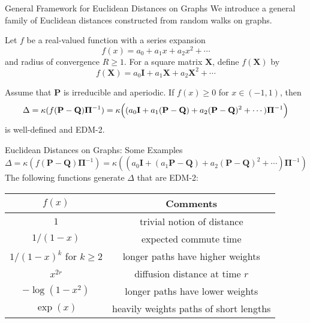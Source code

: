 \documentclass[professionalfonts, hyperref={pdfpagelabels=false,
  colorlinks=true, linkcolor=purple}]{beamer}
\begin{document}
\begin{frame}{General Framework for Euclidean Distances on Graphs}
  We introduce a general family of Euclidean distances constructed
  from random walks on graphs. 
  
  \vskip10pt Let $f$ be a real-valued function with a
    series expansion
    \begin{equation*}
      f(x) = a_0 + a_1 x + a_2 x^2 + \cdots
    \end{equation*}
    and radius of convergence $R \geq 1$. For a square matrix
    $\mathbf{X}$, define $f(\mathbf{X})$ by
    \begin{equation*}
      f(\mathbf{X}) = a_0 \mathbf{I} + a_1 \mathbf{X} + a_2
      \mathbf{X}^{2} + \cdots
    \end{equation*}
    \begin{theorem}
      Assume that $\mathbf{P}$ is irreducible and aperiodic. If $f(x)
      \geq 0$ for $x \in (-1,1)$, then
      \begin{equation}
        \Delta = \kappa(f(\mathbf{P} - \mathbf{Q})
        \bm{\Pi}^{-1}) =
        \kappa\Bigl((a_0
        \mathbf{I} + a_1 (\mathbf{P} - \mathbf{Q}) + a_2 (\mathbf{P} -
        \mathbf{Q})^2 + \cdots)\bm{\Pi}^{-1}\Bigr)
      \end{equation}
      is well-defined and EDM-2. 
      \end{theorem}
\end{frame}

\begin{frame}[t]{Euclidean Distances on Graphs: Some Examples}
    \begin{equation*}
        \Delta = \kappa(f(\mathbf{P} - \mathbf{Q}) \bm{\Pi}^{-1}) =
        \kappa((a_0 \mathbf{I} + (a_1 \mathbf{P} - \mathbf{Q}) + a_2
	(\mathbf{P} - \mathbf{Q})^2 + \cdots)\bm{\Pi}^{-1})
    \end{equation*}
  \vskip 10pt The following functions generate $\Delta$ that are
  EDM-2:
  \vskip10pt
  \begin{center}
  \begin{tabular}{|c|c|}
    \hline
    $f(x)$ & Comments \\ \hline
    $1$ & trivial notion of distance \\ \hline
    $1/(1-x)$ & expected commute time \\ \hline
    $1/(1-x)^k$ for $k \geq 2$ & 
    longer paths have higher weights \\ \hline
    $x^{2r}$ & diffusion distance at time $r$ \\ \hline
   $ - \log{(1-x^2)}$ & longer paths have
    lower weights \\ \hline
   $\exp(x)$ & heavily weights paths of short lengths \\ \hline
  \end{tabular}
  \end{center}
  \end{frame}
\end{document}
